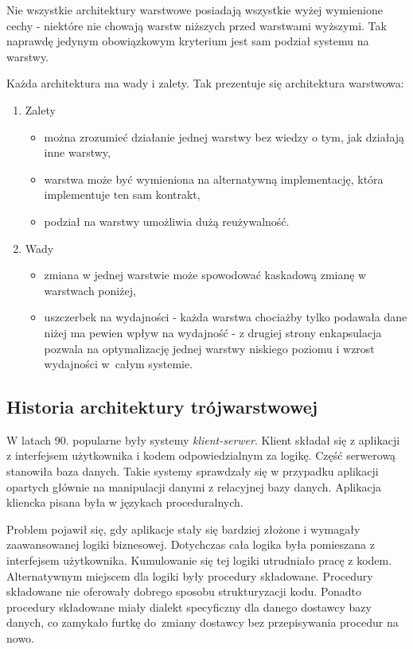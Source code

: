 \documentclass[a4paper,onecolumn,oneside,11pt,wide,floatssmall]{mwrep}
\theoremstyle{definition}
\theoremstyle{plain}%
\theoremstyle{remark}
\begin{document}
Nie wszystkie architektury warstwowe posiadają wszystkie wyżej wymienione cechy - niektóre nie chowają warstw niższych 
przed warstwami wyższymi. Tak naprawdę jedynym obowiązkowym kryterium jest sam podział systemu na warstwy.

Każda architektura ma wady i zalety. Tak prezentuje się architektura warstwowa:

\begin{enumerate}
  \item Zalety
    \begin{itemize}
      \item można zrozumieć działanie jednej warstwy bez wiedzy o tym, jak działają inne warstwy,
      \item warstwa może być wymieniona na alternatywną implementację, która implementuje ten sam kontrakt,
      \item podział na warstwy umożliwia dużą reużywalność.
    \end{itemize}
  \item Wady
    \begin{itemize}
      \item zmiana w jednej warstwie może spowodować kaskadową zmianę w warstwach poniżej,
      \item uszczerbek na wydajności - każda warstwa chociażby tylko podawała dane niżej ma pewien wpływ na wydajność -
       z drugiej strony enkapsulacja pozwala na optymalizację jednej warstwy niskiego poziomu i wzrost wydajności \mbox{w 
              całym} systemie.
    \end{itemize}
\end{enumerate}

\subsection{Historia architektury trójwarstwowej}
W latach 90. popularne były systemy \emph{klient-serwer}. Klient składał się z aplikacji z interfejsem użytkownika i 
kodem odpowiedzialnym za logikę. Część serwerową stanowiła baza danych. Takie systemy sprawdzały się w przypadku 
aplikacji opartych głównie na manipulacji danymi z relacyjnej bazy danych. Aplikacja kliencka pisana była w językach 
proceduralnych.

Problem pojawił się, gdy aplikacje stały się bardziej złożone i wymagały zaawansowanej logiki biznesowej. Dotychczas 
cała logika była pomieszana z interfejsem użytkownika. Kumulowanie się tej logiki utrudniało pracę z kodem. 
Alternatywnym miejscem dla logiki były procedury składowane. Procedury składowane nie oferowały dobrego sposobu 
strukturyzacji kodu. Ponadto procedury składowane miały dialekt specyficzny dla danego dostawcy bazy danych, co 
zamykało furtkę \mbox{do zmiany} dostawcy bez przepisywania procedur na nowo. 
\end{document}
